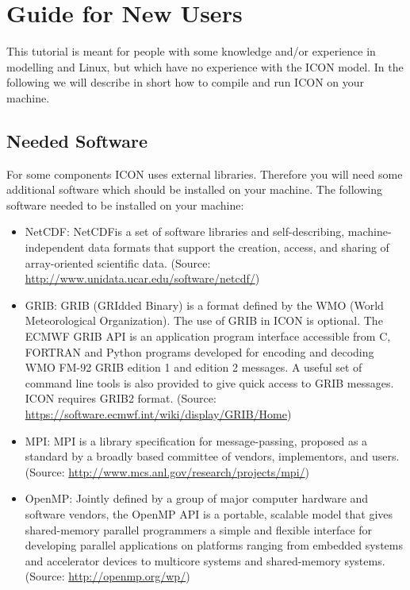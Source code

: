 \chapter{Guide for New Users}

\newcommand{\netcdf}{NetCDF}


This tutorial is meant for people with some knowledge and/or experience in modelling and Linux, but which have no experience with the ICON model. In the following we will describe in short how to compile and run ICON on your machine. 

\section{Needed Software}

For some components ICON uses external libraries. Therefore you will need some additional software which should be installed on your machine. The following software needed to be installed on your machine:

\begin{itemize}
 \item \netcdf : \netcdf is a set of software libraries and self-describing, machine-independent data formats that support the creation, access, and sharing of array-oriented scientific data.\newline
 (Source: \href{http://www.unidata.ucar.edu/software/netcdf/}{http://www.unidata.ucar.edu/software/netcdf/})
 \item GRIB: GRIB (GRIdded Binary) is a format defined by the WMO (World Meteorological Organization). The use of GRIB in ICON is optional. The ECMWF GRIB API is an application program interface accessible from C, FORTRAN and Python programs developed for encoding and decoding WMO FM-92 GRIB edition 1 and edition 2 messages. A useful set of command line tools is also provided to give quick access to GRIB messages. ICON requires GRIB2 format. \newline
 (Source: \href{https://software.ecmwf.int/wiki/display/GRIB/Home}{https://software.ecmwf.int/wiki/display/GRIB/Home})
 \item MPI: MPI is a library specification for message-passing, proposed as a standard by a broadly based committee of vendors, implementors, and users.\newline
 (Source: \href{http://www.mcs.anl.gov/research/projects/mpi/}{http://www.mcs.anl.gov/research/projects/mpi/})
 \item OpenMP: Jointly defined by a group of major computer hardware and software vendors, the OpenMP API is a portable, scalable model that gives shared-memory parallel programmers a simple and flexible interface for developing parallel applications on platforms ranging from embedded systems and accelerator devices to multicore systems and shared-memory systems.\newline
 (Source: \href{http://openmp.org/wp/}{http://openmp.org/wp/})
\end{itemize}

